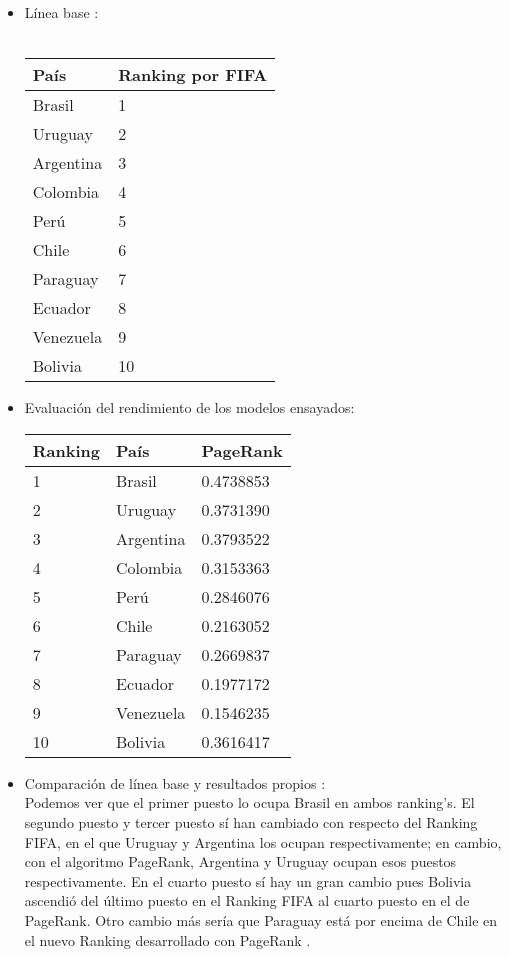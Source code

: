 \documentclass[twocolumn]{article}
\begin{document}
\begin{itemize}
	\item
Línea base :\\ \\
    \begin{tabular}{|l|l|}
	\hline
País & Ranking por FIFA \\
\hline \hline
Brasil & 1\\ \hline
Uruguay & 2 \\ \hline
Argentina & 3 \\ \hline
Colombia & 4 \\ \hline
Perú & 5 \\ \hline
Chile & 6 \\ \hline
Paraguay & 7 \\ \hline
Ecuador & 8 \\ \hline
Venezuela & 9 \\ \hline
Bolivia & 10 \\ \hline
\end{tabular}
	\item
Evaluación del rendimiento de los modelos ensayados: \\

	\begin{tabular}{|l|l|l|}
	\hline
Ranking & País  & PageRank\\
\hline \hline \hline
1&Brasil & 0.4738853  \\ \hline
2&Uruguay & 0.3731390  \\ \hline
3&Argentina & 0.3793522  \\ \hline
4&Colombia & 0.3153363  \\ \hline
5&Perú & 0.2846076  \\ \hline
6&Chile & 0.2163052 \\ \hline
7&Paraguay & 0.2669837  \\ \hline
8&Ecuador & 0.1977172 \\ \hline
9&Venezuela & 0.1546235 \\ \hline
10&Bolivia & 0.3616417  \\ \hline

\end{tabular}
    \item
    Comparación de línea base y resultados propios :\\ 
 Podemos ver que el primer puesto lo ocupa Brasil en ambos ranking's. El segundo puesto y tercer puesto sí han cambiado con respecto del Ranking FIFA, en el que Uruguay y Argentina los ocupan respectivamente; en cambio, con el algoritmo PageRank, Argentina y Uruguay ocupan esos puestos respectivamente. En el cuarto puesto sí hay un gran cambio pues Bolivia ascendió del último puesto en el Ranking FIFA al cuarto puesto en el de PageRank. Otro cambio más sería que Paraguay está por encima de Chile en el nuevo Ranking desarrollado con PageRank .
	\end{itemize}	
\end{document}
